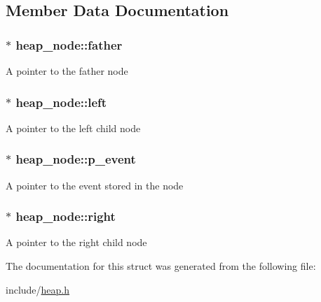 \subsection{Member Data Documentation}
\hypertarget{structheap__node_a7194b57dca6a769e6453844acc2b7d92}{
\subsubsection[{father}]{$\ast$ heap\-\_\-node\-::father}}\label{structheap__node_a7194b57dca6a769e6453844acc2b7d92}
A pointer to the father node \hypertarget{structheap__node_a14e93b10342511f5f5dfa9554c4762c0}{
\subsubsection[{left}]{$\ast$ heap\-\_\-node\-::left}}\label{structheap__node_a14e93b10342511f5f5dfa9554c4762c0}
A pointer to the left child node \hypertarget{structheap__node_a79b2fa864243fdcb2cae3e7d286e9709}{
\subsubsection[{p\-\_\-event}]{$\ast$ heap\-\_\-node\-::p\-\_\-event}}\label{structheap__node_a79b2fa864243fdcb2cae3e7d286e9709}
A pointer to the event stored in the node \hypertarget{structheap__node_a43d2d8faac7921c4c08cff948c29373b}{
\subsubsection[{right}]{$\ast$ heap\-\_\-node\-::right}}\label{structheap__node_a43d2d8faac7921c4c08cff948c29373b}
A pointer to the right child node 

The documentation for this struct was generated from the following file\-:\begin{DoxyCompactItemize}
\item 
include/\hyperlink{heap_8h}{heap.\-h}\end{DoxyCompactItemize}
